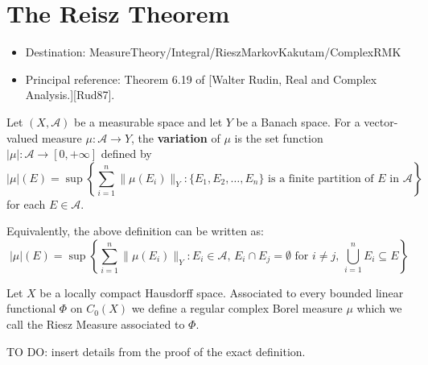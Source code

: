 \chapter{The Reisz Theorem}

\begin{itemize}
  \item Destination: MeasureTheory/Integral/RieszMarkovKakutam/ComplexRMK
  \item Principal reference: Theorem 6.19 of [Walter Rudin, Real and Complex Analysis.][Rud87].
\end{itemize}

\noindent
{}

\begin{definition}
  \label{def:variation}
  \leanok
  Let $(X, \mathcal{A})$ be a measurable space and let $Y$ be a Banach space. For a vector-valued measure $\mu: \mathcal{A} \to Y$, the \textbf{variation} of $\mu$ is the set function $|\mu|: \mathcal{A} \to [0, +\infty]$ defined by
  \begin{equation*}
    |\mu|(E) = \sup \left\{ \sum_{i=1}^n \|\mu(E_i)\|_Y : \{E_1, E_2, \ldots, E_n\} \text{ is a finite partition of } E \text{ in } \mathcal{A} \right\}
  \end{equation*}
  for each $E \in \mathcal{A}$.
\end{definition}

Equivalently, the above definition can be written as:
\begin{equation*}
  |\mu|(E) = \sup \left\{ \sum_{i=1}^n \|\mu(E_i)\|_Y : E_i \in \mathcal{A}, \, E_i \cap E_j = \emptyset \text{ for } i \neq j, \, \bigcup_{i=1}^n E_i \subseteq E \right\}
\end{equation*}

\begin{definition}
  \label{def:riesz_measure}
  \notready
  Let $X$ be a locally compact Hausdorff space.
  Associated to every bounded linear functional $\Phi$ on $C_0(X)$ we define a regular complex Borel measure $\mu$ which we call the Riesz Measure associated to $\Phi$.

  TO DO: insert details from the proof of the exact definition.
\end{definition}

